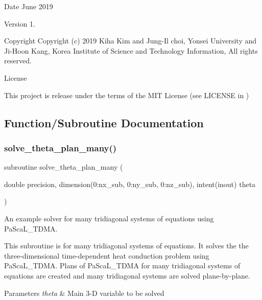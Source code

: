 \begin{DoxyDate}{Date}
June 2019 
\end{DoxyDate}
\begin{DoxyVersion}{Version}
1. 
\end{DoxyVersion}
\begin{DoxyParagraph}{Copyright}
Copyright (c) 2019 Kiha Kim and Jung-\/\+Il choi, Yonsei University and Ji-\/\+Hoon Kang, Korea Institute of Science and Technology Information, All rights reserved. 
\end{DoxyParagraph}
\begin{DoxyParagraph}{License }

\end{DoxyParagraph}
This project is release under the terms of the M\+IT License (see L\+I\+C\+E\+N\+SE in ) 

\subsection{Function/\+Subroutine Documentation}
\mbox{\label{solve__theta__plan__many_8f90_af048018fcdfbe66e00922dee3e7e9a64}} 
\subsubsection{\texorpdfstring{solve\_theta\_plan\_many()}{solve\_theta\_plan\_many()}}
{\footnotesize\ttfamily subroutine solve\+\_\+theta\+\_\+plan\+\_\+many (\begin{DoxyParamCaption}\item[{double precision, dimension(0\+:nx\+\_\+sub, 0\+:ny\+\_\+sub, 0\+:nz\+\_\+sub), intent(inout)}]{theta }\end{DoxyParamCaption})}



An example solver for many tridiagonal systems of equations using Pa\+Sca\+L\+\_\+\+T\+D\+MA. 

This subroutine is for many tridiagonal systems of equations. It solves the the three-\/dimensional time-\/dependent heat conduction problem using Pa\+Sca\+L\+\_\+\+T\+D\+MA. Plans of Pa\+Sca\+L\+\_\+\+T\+D\+MA for many tridiagonal systems of equations are created and many tridiagonal systems are solved plane-\/by-\/plane. 
\begin{DoxyParams}{Parameters}
{\em theta} & Main 3-\/D variable to be solved \\
\hline
\end{DoxyParams}


